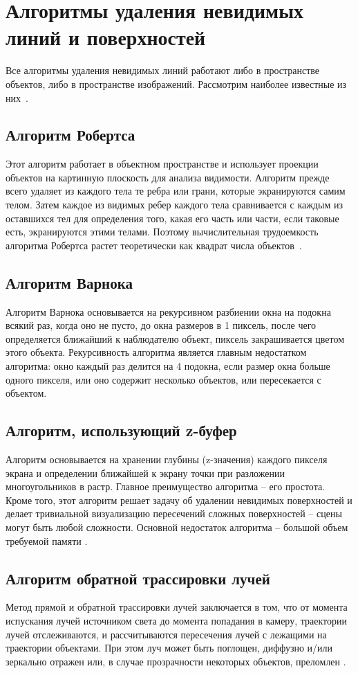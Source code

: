 \section{Алгоритмы удаления невидимых линий и поверхностей}
Все алгоритмы удаления невидимых линий работают либо в пространстве объектов, либо в пространстве изображений. Рассмотрим наиболее известные из них~\cite{lit1}.
\subsection{Алгоритм Робертса}
Этот алгоритм работает в объектном пространстве и использует проекции объектов на картинную плоскость для анализа видимости. Алгоритм прежде всего удаляет из каждого тела те ребра или грани, которые экранируются самим телом. Затем каждое из видимых ребер каждого тела сравнивается с каждым из оставшихся тел для определения того, какая его часть или части, если таковые есть, экранируются этими телами. Поэтому вычислительная трудоемкость алгоритма Робертса растет теоретически как квадрат числа объектов~\cite{lit1}.

\subsection{Алгоритм Варнока}
Алгоритм Варнока основывается на рекурсивном разбиении окна на подокна всякий раз, когда оно не пусто, до окна размеров в 1 пиксель, после чего определяется ближайший к наблюдателю объект, пиксель закрашивается цветом этого объекта. Рекурсивность алгоритма является главным недостатком алгоритма: окно каждый раз делится на 4 подокна, если размер окна больше одного пикселя, или оно содержит несколько объектов, или пересекается с объектом.

\subsection{Алгоритм, использующий z-буфер}

Алгоритм основывается на хранении глубины (z-значения) каждого пикселя экрана и определении ближайшей к экрану точки при разложении многоугольников в растр.
Главное преимущество алгоритма -- его простота. Кроме того, этот алгоритм решает задачу об удалении невидимых поверхностей и делает тривиальной визуализацию пересечений сложных поверхностей -- сцены могут быть любой сложности.
Основной недостаток алгоритма -- большой объем требуемой памяти \cite{lit1}.


\subsection{Алгоритм обратной трассировки лучей}
Метод прямой и обратной трассировки лучей заключается в том, что от момента испускания лучей источником света до момента попадания в камеру, траектории лучей отслеживаются, и рассчитываются пересечения лучей с лежащими на траектории объектами. При этом луч может быть поглощен, диффузно и/или зеркально отражен или, в случае прозрачности некоторых объектов, преломлен \cite{lit4}.

